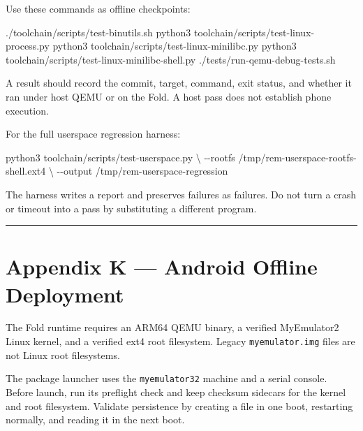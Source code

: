 \documentclass[
  oneside,
  openany]{book}
\newenvironment{Shaded}{\begin{snugshade}}{\end{snugshade}}
\newcommand{\AttributeTok}[1]{\textcolor[rgb]{0.13,0.29,0.53}{#1}}
\newcommand{\DataTypeTok}[1]{\textcolor[rgb]{0.13,0.29,0.53}{#1}}
\newcommand{\ExtensionTok}[1]{#1}
\newcommand{\NormalTok}[1]{#1}
\begin{document}
Use these commands as offline checkpoints:

\begin{Shaded}
\begin{Highlighting}[]
\ExtensionTok{./toolchain/scripts/test{-}binutils.sh}
\ExtensionTok{python3}\NormalTok{ toolchain/scripts/test{-}linux{-}process.py}
\ExtensionTok{python3}\NormalTok{ toolchain/scripts/test{-}linux{-}minilibc.py}
\ExtensionTok{python3}\NormalTok{ toolchain/scripts/test{-}linux{-}minilibc{-}shell.py}
\ExtensionTok{./tests/run{-}qemu{-}debug{-}tests.sh}
\end{Highlighting}
\end{Shaded}

A result should record the commit, target, command, exit status, and
whether it ran under host QEMU or on the Fold. A host pass does not
establish phone execution.

For the full userspace regression harness:

\begin{Shaded}
\begin{Highlighting}[]
\ExtensionTok{python3}\NormalTok{ toolchain/scripts/test{-}userspace.py }\DataTypeTok{\textbackslash{}}
  \AttributeTok{{-}{-}rootfs}\NormalTok{ /tmp/rem{-}userspace{-}rootfs{-}shell.ext4 }\DataTypeTok{\textbackslash{}}
  \AttributeTok{{-}{-}output}\NormalTok{ /tmp/rem{-}userspace{-}regression}
\end{Highlighting}
\end{Shaded}

The harness writes a report and preserves failures as failures. Do not
turn a crash or timeout into a pass by substituting a different program.

\begin{center}\rule{0.5\linewidth}{0.5pt}\end{center}

\hypertarget{appendix-k-android-offline-deployment}{%
\chapter{Appendix K --- Android Offline
Deployment}\label{appendix-k-android-offline-deployment}}

The Fold runtime requires an ARM64 QEMU binary, a verified MyEmulator2
Linux kernel, and a verified ext4 root filesystem. Legacy
\texttt{myemulator.img} files are not Linux root filesystems.

The package launcher uses the \texttt{myemulator32} machine and a serial
console. Before launch, run its preflight check and keep checksum
sidecars for the kernel and root filesystem. Validate persistence by
creating a file in one boot, restarting normally, and reading it in the
next boot.
\end{document}
